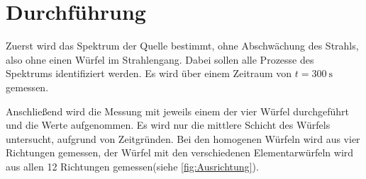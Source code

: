 \section{Durchführung}
\label{sec:Durchführung}
Zuerst wird das Spektrum der Quelle bestimmt, ohne Abschwächung des Strahls, also ohne einen Würfel im Strahlengang.
Dabei sollen alle Prozesse des Spektrums identifiziert werden.
Es wird über einem Zeitraum  von $t = \qty{300}{\second}$ gemessen.

Anschließend wird die Messung mit jeweils einem der vier Würfel durchgeführt und die Werte aufgenommen.
Es wird nur die mittlere Schicht des Würfels untersucht, aufgrund von Zeitgründen.
Bei den homogenen Würfeln wird aus vier Richtungen gemessen, der Würfel mit den verschiedenen 
Elementarwürfeln wird aus allen 12 Richtungen gemessen(siehe \autoref{fig:Ausrichtung}).

